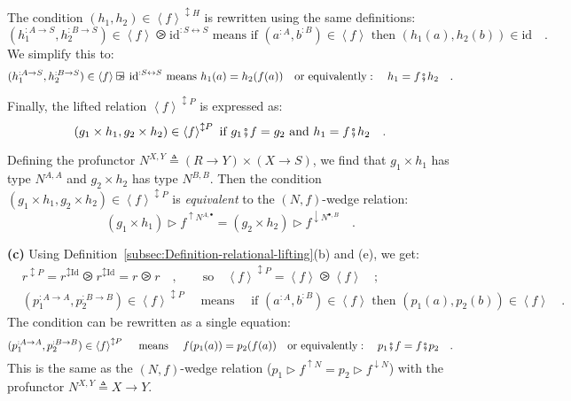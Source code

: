 The condition $(h_{1},h_{2})\in\left<f\right>^{\updownarrow H}$ is
rewritten using the same definitions:
\[
(h_{1}^{:A\rightarrow S},h_{2}^{:B\rightarrow S})\in\left<f\right>\ogreaterthan\text{id}^{:S\leftrightarrow S}\text{ means if }(a^{:A},b^{:B})\in\left<f\right>\text{ then }(h_{1}(a),h_{2}(b))\in\text{id}\quad.
\]
We simplify this to:
\[
(h_{1}^{:A\rightarrow S},h_{2}^{:B\rightarrow S})\in\left<f\right>\ogreaterthan\text{id}^{:S\leftrightarrow S}\text{ means }h_{1}(a)=h_{2}(f(a))\quad\text{or equivalently}:\quad h_{1}=f\bef h_{2}\quad.
\]

Finally, the lifted relation $\left<f\right>^{\updownarrow P}$ is
expressed as:
\[
(g_{1}\times h_{1},g_{2}\times h_{2})\in\left<f\right>^{\updownarrow P}\text{ if }g_{1}\bef f=g_{2}\text{ and }h_{1}=f\bef h_{2}\quad.
\]

Defining the profunctor $N^{X,Y}\triangleq\left(R\rightarrow Y\right)\times\left(X\rightarrow S\right)$,
we find that $g_{1}\times h_{1}$ has type $N^{A,A}$ and $g_{2}\times h_{2}$
has type $N^{B,B}$. Then the condition $(g_{1}\times h_{1},g_{2}\times h_{2})\in\left<f\right>^{\updownarrow P}$
is \emph{equivalent} to the $\left(N,f\right)$-wedge relation:
\[
(g_{1}\times h_{1})\triangleright f^{\uparrow N^{A,\bullet}}=(g_{2}\times h_{2})\triangleright f^{\downarrow N^{\bullet,B}}\quad.
\]

\textbf{(c)} Using Definition~\ref{subsec:Definition-relational-lifting}(b)
and (e), we get:
\begin{align*}
 & r^{\updownarrow P}=r^{\updownarrow\text{Id}}\ogreaterthan r^{\updownarrow\text{Id}}=r\ogreaterthan r\quad,\quad\quad\text{so}\quad\left<f\right>^{\updownarrow P}=\left<f\right>\ogreaterthan\left<f\right>\quad;\\
 & (p_{1}^{:A\rightarrow A},p_{2}^{:B\rightarrow B})\in\left<f\right>^{\updownarrow P}\quad\text{ means }\quad\text{if }(a^{:A},b^{:B})\in\left<f\right>\text{ then }(p_{1}(a),p_{2}(b))\in\left<f\right>\quad.
\end{align*}
The condition can be rewritten as a single equation:
\[
(p_{1}^{:A\rightarrow A},p_{2}^{:B\rightarrow B})\in\left<f\right>^{\updownarrow P}\quad\text{ means }\quad f(p_{1}(a))=p_{2}(f(a))\quad\text{or equivalently}:\quad p_{1}\bef f=f\bef p_{2}\quad.
\]
This is the same as the $\left(N,f\right)$-wedge relation ($p_{1}\triangleright f^{\uparrow N}=p_{2}\triangleright f^{\downarrow N}$)
with the profunctor $N^{X,Y}\triangleq X\rightarrow Y$.

